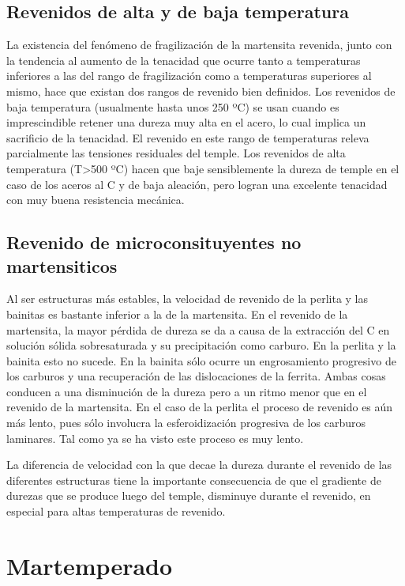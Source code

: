 \documentclass{article}
\begin{document}
\subsection{Revenidos de alta y de baja temperatura}

La existencia del fenómeno de fragilización de la martensita revenida,
junto con la tendencia al aumento de la tenacidad que ocurre tanto a
temperaturas inferiores a las del rango de fragilización como a
temperaturas superiores al mismo, hace que existan dos rangos de
revenido bien definidos.
Los revenidos de baja temperatura (usualmente hasta unos 250 ºC) se
usan cuando es imprescindible retener una dureza muy alta en el acero,
lo cual implica un sacrificio de la tenacidad. El revenido en este rango
de temperaturas releva parcialmente las tensiones residuales del temple.
Los revenidos de alta temperatura (T>500 ºC) hacen que baje
sensiblemente la dureza de temple en el caso de los aceros al C y de baja
aleación, pero logran una excelente tenacidad con muy buena resistencia
mecánica.


\subsection{Revenido de microconsituyentes no martensiticos}

Al ser estructuras más estables, la velocidad de revenido de la perlita y
las bainitas es bastante inferior a la de la martensita.
En el revenido de la martensita, la mayor pérdida de dureza se da a causa
de la extracción del C en solución sólida sobresaturada y su precipitación
como carburo. En la perlita y la bainita esto no sucede.
En la bainita sólo ocurre un engrosamiento progresivo de los carburos y
una recuperación de las dislocaciones de la ferrita. Ambas cosas
conducen a una disminución de la dureza pero a un ritmo menor que en el
revenido de la martensita.
En el caso de la perlita el proceso de revenido es aún más lento, pues sólo
involucra la esferoidización progresiva de los carburos laminares. Tal
como ya se ha visto este proceso es muy lento.

La diferencia de velocidad
con la que decae la dureza
durante el revenido de las
diferentes estructuras tiene la
importante consecuencia de
que el gradiente de durezas
que se produce luego del
temple, disminuye durante
el revenido, en especial para
altas temperaturas de
revenido.

\section{Martemperado}
\end{document}
